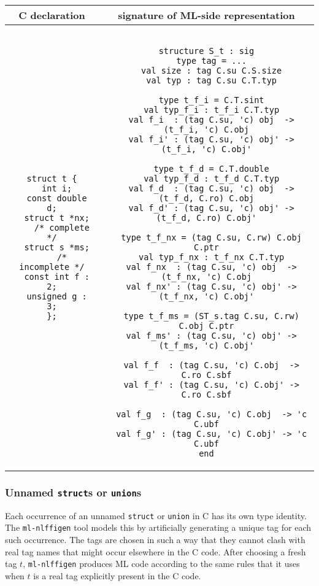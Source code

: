 \documentclass[titlepage,letterpaper]{article}
\newcommand{\gentool}{{\tt ml-nlffigen}}
\begin{document}
\begin{small}
\begin{center}
\begin{tabular}{c|c}
C declaration & signature of ML-side representation \\ \hline\hline
\begin{minipage}{2in}
\begin{verbatim}
struct t {
  int i;
  const double d;
  struct t *nx;
    /* complete */
  struct s *ms;
    /* incomplete */
  const int f : 2;
  unsigned g : 3;
};
\end{verbatim}
\end{minipage}
&
\begin{minipage}{4in}
\begin{verbatim}

structure S_t : sig
  type tag = ...
  val size : tag C.su C.S.size
  val typ : tag C.su C.T.typ

  type t_f_i = C.T.sint
  val typ_f_i : t_f_i C.T.typ
  val f_i  : (tag C.su, 'c) obj  -> (t_f_i, 'c) C.obj
  val f_i' : (tag C.su, 'c) obj' -> (t_f_i, 'c) C.obj'

  type t_f_d = C.T.double
  val typ_f_d : t_f_d C.T.typ
  val f_d  : (tag C.su, 'c) obj  -> (t_f_d, C.ro) C.obj
  val f_d' : (tag C.su, 'c) obj' -> (t_f_d, C.ro) C.obj'

  type t_f_nx = (tag C.su, C.rw) C.obj C.ptr
  val typ_f_nx : t_f_nx C.T.typ
  val f_nx  : (tag C.su, 'c) obj  -> (t_f_nx, 'c) C.obj
  val f_nx' : (tag C.su, 'c) obj' -> (t_f_nx, 'c) C.obj'

  type t_f_ms = (ST_s.tag C.su, C.rw) C.obj C.ptr
  val f_ms' : (tag C.su, 'c) obj' -> (t_f_ms, 'c) C.obj'

  val f_f  : (tag C.su, 'c) C.obj  -> C.ro C.sbf
  val f_f' : (tag C.su, 'c) C.obj' -> C.ro C.sbf

  val f_g  : (tag C.su, 'c) C.obj  -> 'c C.ubf
  val f_g' : (tag C.su, 'c) C.obj' -> 'c C.ubf
end

\end{verbatim}
\end{minipage}
\end{tabular}
\end{center}
\end{small}

\subsubsection*{Unnamed {\tt struct}s or {\tt union}s}

Each occurrence of an unnamed {\tt struct} or {\tt union} in C has its
own type identity.  The {\gentool} tool models this by artificially
generating a unique tag for each such occurrence.  The tags are chosen
in such a way that they cannot clash with real tag names that might
occur elsewhere in the C code.  After choosing a fresh tag $t$,
{\gentool} produces ML code according to the same rules that it uses
when $t$ is a real tag explicitly present in the C code.
\end{document}
